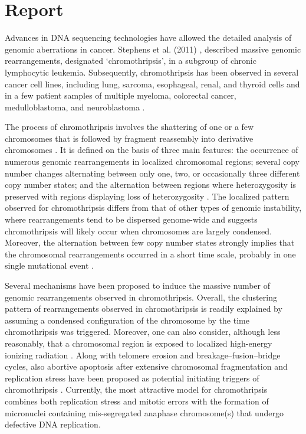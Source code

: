 \section*{Report}
Advances in DNA sequencing technologies have allowed the detailed analysis of genomic aberrations in cancer. Stephens et al. (2011) \cite{stephens2011massive}, described massive genomic rearrangements, designated ‘chromothripsis’, in a subgroup of chronic lymphocytic leukemia. Subsequently, chromothripsis has been observed in several cancer cell lines, including lung, sarcoma, esophageal, renal, and thyroid cells and in a few patient samples of multiple myeloma, colorectal cancer, medulloblastoma, and neuroblastoma \cite{magrangeas2011chromothripsis,kloosterman2011chromothripsis,rausch2012genome,molenaar2012sequencing}.

The process of chromothripsis involves the shattering of one or a few chromosomes that is followed by fragment reassembly into derivative chromosomes
\cite{maher2012chromothripsis}. It is defined on the basis of three main features: the occurrence of numerous genomic rearrangements in localized chromosomal
regions; several copy number changes alternating between only one, two, or occasionally three different copy number states; and the alternation between
regions where heterozygosity is preserved with regions displaying loss of heterozygosity \cite{maher2012chromothripsis}. The localized pattern observed for
chromothripsis differs from that of other types of genomic instability, where rearrangements tend to be dispersed genome-wide \cite{campbell2008identification,stephens2009complex} and suggests chromothripsis will likely occur when chromosomes are largely condensed. Moreover, the alternation between few copy
number states strongly implies that the chromosomal rearrangements occurred in a short time scale, probably in one single mutational event
\cite{stephens2011massive, righolt2012shattered}.

Several mechanisms have been proposed to induce the massive number of genomic rearrangements observed in chromothripsis. Overall, the clustering
pattern of rearrangements observed in chromothripsis is readily explained by assuming a condensed configuration of the chromosome by the time
chromothripsis was triggered. Moreover, one can also consider, although less reasonably, that a chromosomal region is exposed to localized high-energy
ionizing radiation \cite{misteli2007beyond}. Along with telomere erosion and breakage–fusion–bridge cycles, also abortive apoptosis after extensive chromosomal
fragmentation and replication stress have been proposed as potential initiating triggers of chromothripsis \cite{jones2012chromothripsis}.
Currently, the most attractive model for chromothripsis combines both replication stress and mitotic errors with the formation of micronuclei containing
mis-segregated anaphase chromosome(s) that undergo defective DNA replication.

